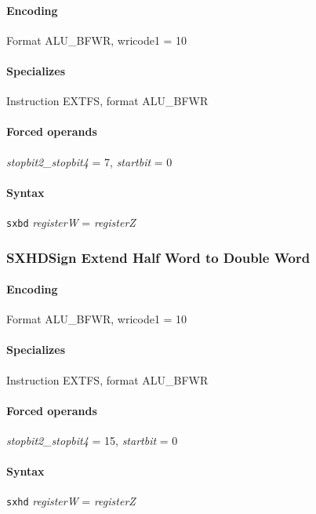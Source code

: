 {\paragraph{Encoding} Format \textsf{ALU\_BFWR, wricode1 = 10}\\



\paragraph{Specializes} Instruction EXTFS, format ALU\_BFWR

\paragraph{Forced operands} \emph{stopbit2\_stopbit4} = 7, \emph{startbit} = 0

\paragraph{Syntax} \texttt{sxbd} \emph{registerW} = \emph{registerZ}
\newpage
\subsubsection[{\small SXHD: Sign Extend Half Word to Double Word}]{SXHD\hfill Sign Extend Half Word to Double Word}
\label{instr:SXHD}

\paragraph{Encoding} Format \textsf{ALU\_BFWR, wricode1 = 10}\\



\paragraph{Specializes} Instruction EXTFS, format ALU\_BFWR

\paragraph{Forced operands} \emph{stopbit2\_stopbit4} = 15, \emph{startbit} = 0

\paragraph{Syntax} \texttt{sxhd} \emph{registerW} = \emph{registerZ}
\newpage
}
